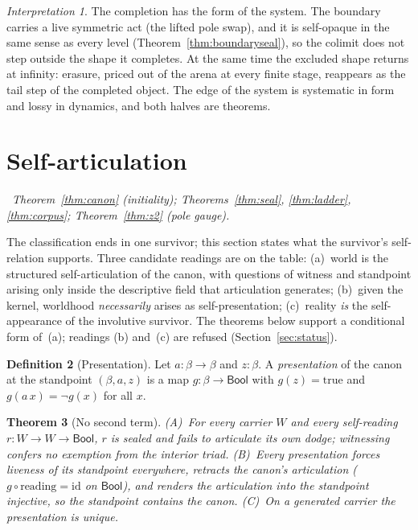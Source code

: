 \documentclass[11pt,a4paper]{article}
\theoremstyle{plain}
\newtheorem{theorem}{Theorem}[section]
\theoremstyle{definition}
\newtheorem{definition}[theorem]{Definition}
\theoremstyle{remark}
\newtheorem{interpretation}[theorem]{Interpretation}
\newcommand{\Bool}{\mathsf{Bool}}
\newcommand{\comp}{\circ}
\newcommand{\act}{a}
\newcommand{\dep}[1]{%
  \par\noindent{\small\color{muted}\sffamily Dependence:}~\textit{#1}\par\medskip}
\begin{document}
\begin{interpretation}
\label{int:boundary}
The completion has the form of the system. The boundary carries a
live symmetric act (the lifted pole swap), and it is self-opaque in
the same sense as every level (Theorem~\ref{thm:boundaryseal}), so
the colimit does not step outside the shape it completes. At the same
time the excluded shape returns at infinity: erasure, priced out of
the arena at every finite stage, reappears as the tail step of the
completed object. The edge of the system is systematic in form and
lossy in dynamics, and both halves are theorems.
\end{interpretation}


\section{Self-articulation}
\label{sec:selfart}

\dep{Theorem~\ref{thm:canon} (initiality); Theorems~\ref{thm:seal},
\ref{thm:ladder}, \ref{thm:corpus}; Theorem~\ref{thm:z2} (pole gauge).}

The classification ends in one survivor; this section states what the
survivor's self-relation supports. Three candidate readings are on the
table: (a)~world is the structured self-articulation of the canon, with
questions of witness and standpoint arising only inside the descriptive
field that articulation generates; (b)~given the kernel, worldhood
\emph{necessarily} arises as self-presentation; (c)~reality \emph{is}
the self-appearance of the involutive survivor. The theorems below
support a conditional form of~(a); readings (b) and~(c) are refused
(Section~\ref{sec:status}).

\begin{definition}[Presentation]
\label{def:pres}
Let $\act:\beta\to\beta$ and $z:\beta$. A \emph{presentation} of the
canon at the standpoint $(\beta,\act,z)$ is a map $g:\beta\to\Bool$ with
$g(z)=\mathrm{true}$ and $g(\act\,x)=\neg g(x)$ for all $x$.
\end{definition}

\begin{theorem}[No second term]
\label{thm:noext}
\textup{(A)}~For every carrier $W$ and every self-reading
$r:W\to W\to\Bool$, $r$ is sealed and fails to articulate its own
dodge; witnessing confers no exemption from the interior triad.
\textup{(B)}~Every presentation forces liveness of its standpoint
everywhere, retracts the canon's articulation
($g\comp\mathrm{reading}=\mathrm{id}$ on $\Bool$), and renders the
articulation into the standpoint injective, so the standpoint contains
the canon. \textup{(C)}~On a generated carrier the presentation is
unique.
\end{theorem}
\end{document}
